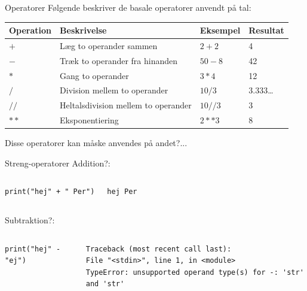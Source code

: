 \documentclass{beamer}
\begin{document}
\begin{frame}[fragile]{Operatorer}
Følgende beskriver de basale operatorer anvendt på tal:
\begin{center}
\begin{tabular}{llll}
\hline
Operation			& 		Beskrivelse								&		Eksempel		&		Resultat	\\ \hline \hline
$+$					&		Læg to operander sammen					&		$2+2$			&		4			\\
$-$					&		Træk to operander fra hinanden			&		$50-8$			&		42			\\
$*$					&		Gang to operander 						&		$3*4$			&		12			\\
$/$					&		Division mellem to operander			&		$10/3$			&		3.333\dots			\\
$//$				&		Heltalsdivision mellem to operander		&		$10//3$			&		3			\\
$**$				&		Eksponentiering							&		$2**3$			&		8			\\
\end{tabular}
\end{center}
\vfill
\pause Disse operatorer kan måske anvendes på andet?...
\end{frame}


\begin{frame}[fragile]{Streng-operatorer}
Addition?:
\begin{columns}
\begin{lstlisting}[style=python]
print("hej" + " Per")
\end{lstlisting}
\pause
{}
\begin{lstlisting}[style=python]
hej Per
\end{lstlisting}
\end{columns}
\pause
Subtraktion?:
\begin{columns}
\begin{lstlisting}[style=python]
print("hej" - "ej")
\end{lstlisting}
\pause
{}
\begin{lstlisting}[style=python]
Traceback (most recent call last):
File "<stdin>", line 1, in <module>
TypeError: unsupported operand type(s) for -: 'str' and 'str'
\end{lstlisting}
\end{columns}
\end{frame}
\end{document}

